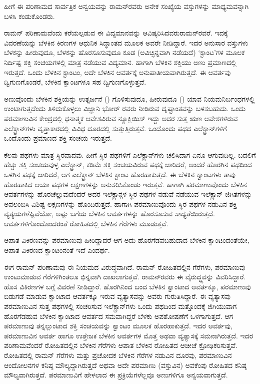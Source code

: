 ಹೀಗೆ ಈ ಪರಿಣಾಮದ ಸಾರ್ವತ್ರಿಕ ಅನ್ವಯವನ್ನು ರಾಮನ್‍ರವರು ಅನೇಕ ಸಂಖ್ಯೆಯ ವಸ್ತುಗಳನ್ನು ಮಾಧ್ಯಮವನ್ನಾಗಿ ಬಳಸಿ ಕಂಡುಕೊಂಡರು.

ರಾಮನ್ ಪರಿಣಾಮವೆಂದು ಕರೆಯಲ್ಪಡುವ ಈ ವಿದ್ಯಮಾನವನ್ನು ಆವಿಷ್ಕರಿಸಿದವರು\break ರಾಮನ್‍ರವರೆ. ಇದಕ್ಕೆ ವಿವರಣೆಯನ್ನು ಬೆಳಕಿನ ಕಿರಣಗಳ ಆಧುನಿಕ ಸಿದ್ಧಾಂತದ ಮೂಲಕ ಅವರೇ ನೀಡಿದ್ದಾರೆ. ಇದರ ಅನುಸಾರ ವಸ್ತುಗಳು ಬೆಳಕನ್ನು ಹೀರುವುದೂ, ಬೆಳಕನ್ನು ಹೊರಸೂಸುವುದೂ ಕೂಡ (ಅವಿಚ್ಛಿನ್ನವಾಗಿ ನಡೆಯದೆ) ‘ಕ್ಟಾಂಟ’ಗಳ ಮೂಲಕ ನಿರ್ದಿಷ್ಟ ಶಕ್ತಿ ಸಂಚಯಗಳಲ್ಲಿ ಮಾತ್ರ ನಡೆಯುವ ವಿದ್ಯಮಾನ. ಹಾಗಾಗಿ ಬೆಳಕಿನ ಶಕ್ತಿಯು ಅಣು ಪ್ರಮಾಣದಲ್ಲಿ ಇರುತ್ತದೆ. ಒಂದು ಬೆಳಕಿನ ಕ್ಟಾಂಟಂ, ಅದೇ ಬೆಳಕಿನ ಆವರ್ತಕ್ಕೆ ಅನುಪಾತೀಯವಾಗಿರುತ್ತದೆ. ಈ ಆವರ್ತವು ದ್ವಿಗುಣಗೊಂಡರೆ, ಬೆಳಕಿನ ಕ್ವಾಂಟಗಳೂ ಸಹ ದ್ವಿಗುಣಗೊಳ್ಳುತ್ತವೆ.

ಅಣುವೊಂದು ಬೆಳಕಿನ ಶಕ್ತಿಯನ್ನು ಉತ್ಸರ್ಜನೆ () ಗೊಳಿಸುವುದೂ, ಹೀರುವುದೂ () ಯಾವ ನಿಯಮ\enginline{-}ನಿರ್ಬಂಧಗಳಲ್ಲಿ ಉಂಟಾಗುತ್ತದೆಂದು ತಿಳಿದುಕೊಳ್ಳಲು ವಿಜ್ಞಾನಿ ಭೋರ್ ರವರು ನೀಡಿರುವ ದೃಷ್ಟಾಂತವನ್ನು ಬಳಸಬಹುದು. ಒಂದು ಪರಮಾಣುವಿನ ಕೇಂದ್ರದಲ್ಲಿ ಧನಾತ್ಮಕ ಆವೇಶವಿರುವ ನ್ಯೂಕ್ಲಿಯಿಸ್ ಇದ್ದು ಅದರ ಸುತ್ತ ಋಣ ಆವೇಶಗಳಿರುವ ಎಲೆಕ್ಟ್ರಾನ್‍ಗಳು ವೃತ್ತಾಕಾರದಲ್ಲಿ ವಿವಿಧ ದೂರದಲ್ಲಿ ಸುತ್ತುತ್ತಿರುತ್ತವೆ. ಒಂದೊಂದು ಪಥದ ಎಲೆಕ್ಟ್ರಾನ್‌ಗಳಿಗೆ ಒಂದೊಂದು ಪ್ರಮಾಣದ ಶಕ್ತಿ ಸಂಚಯ ಇರುತ್ತದೆ.

ಕೆಲವು ಪಥಗಳು ಮಾತ್ರ ಸ್ಥಿರವಾದವು. ಹೀಗೆ ಸ್ಥಿರ ಪಥಗಳಿಗೆ ಎಲೆಕ್ಟ್ರಾನ್‍ಗಳು ಚಲಿಸಿದಾಗ ಏನೂ ಆಗುವುದಿಲ್ಲ. ಬದಲಿಗೆ ಹೆಚ್ಚು ಶಕ್ತಿ ಸಂಚಯವುಳ್ಳ ಎಲೆಕ್ಟ್ರಾನ್, ಕಡಿಮೆ ಶಕ್ತಿ ಸಂಚಯವಿರುವ ಪಥಕ್ಕೆ ಜಾರಿದರೆ, ಅಂದರೆ ಹೊರಗಿನ ಪಥದಿಂದ ಒಳಗಿನ ಪಥಕ್ಕೆ ಜಾರಿದರೆ, ಆಗ ಎಲೆಕ್ಟ್ರಾನ್ ಬೆಳಕಿನ ಕ್ಟಾಂಟ ಹೊರಹಾಕುತ್ತದೆ. ಈ ಬೆಳಕಿನ ಕ್ವಾಂಟಗಳು ತಾವು ಹೊರಹಾಕಿದ ಆಯಾ ಪಥಗಳ ಲಕ್ಷಣಗಳನ್ನು ಅನುಸರಿಸಿಕೊಂಡು ಇರುತ್ತವೆ. ಹಾಗಾಗಿ ಪರಮಾಣುವೊಂದು ಬೆಳಕಿನ ಆವರ್ತಗಳನ್ನು ಹೊರಚೆಲ್ಲುವುದೆಂದರೆ ಅದರ ಇಲೆಕ್ಟ್ರಾನ್ಗಳ ಸ್ಥಿರ ಪಥಗಳ ನಡುವೆ ನಡೆಯುವ ಇಲೆಕ್ಟ್ರಾನ್ ಜಿಗಿತಗಳನ್ನು ಅವಲಂಬಿಸಿ ವಿಶಿಷ್ಟ ಲಕ್ಷಣಗಳನ್ನು ಹೊಂದಿರುತ್ತದೆ. ಹಾಗಾಗಿ ಪರಮಾಣುವೊಂದು ಸ್ಥಿರ ಪಥಗಳ ನಡುವಿನ ಶಕ್ತಿ ವ್ಯತ್ಯಯಗಳೆಷ್ಟಿವೆಯೋ, ಅಷ್ಟು ಬಗೆಯ ಬೆಳಕಿನ ಆವರ್ತಗಳನ್ನು ಹೊರಸೂಸುವ ಸಾಧ್ಯತೆಯಿರುತ್ತದೆ. ಆವರ್ತಗಳಿಗೊಂದೊಂದರಂತೆ ರೋಹಿತದಲ್ಲಿ ಬೆಳಕಿನ ಗೆರೆಗಳು ಮೂಡುತ್ತವೆ.

ಆಪಾತ ವಿಕಿರಣವನ್ನು ಪರಮಾಣುವು ಹೀರಿದ್ದಾದರೆ ಆಗ ಅದು ಹೊರಗೆಡವಬಹುದಾದ ಬೆಳಕಿನ ಕ್ವಾಂಟಂದಂತೆಯೇ, ಆಪಾತ ವಿಕಿರಣದ ಕ್ವಾಂಟಂನಂತೆ ಇದೆ ಎಂದರ್ಥ.

ಈಗ ರಾಮನ್ ಪರಿಣಾಮವು ಈ ನಿಯಮದ ವಿರುದ್ಧವಾಗಿದೆ. ರಾಮನ್ ರೋಹಿತದಲ್ಲಿನ ಗೆರೆಗಳು, ಪರಮಾಣುವು ಉಂಟುಮಾಡುವ ಗೆರೆಗಳಿಗಿಂತಲೂ ಭಿನ್ನವಾಗಿ ದಾಖಲಾಗುತ್ತವೆ. ರಾಮನ್‍ರವರು ಈ ವೈರುದ್ಧ್ಯವನ್ನು ವಿವರಿಸಿದ್ದಾರೆ. ಹೊಸ ವಿಕಿರಣಗಳ ಬಗ್ಗೆ ವಿವರಣೆ ನೀಡಿದ್ದಾರೆ. ಹೊರಗಿನಿಂದ ಬಂದ ಬೆಳಕಿನ ಕ್ವಾಂಟಾದ ಆವರ್ತಕ್ಕೂ, ಪರಮಾಣುವು ಬಿಡುಗಡೆ ಮಾಡುವ ಕ್ವಾಂಟಾದ ಆವರ್ತಕ್ಕೂ ಇರುವ ವ್ಯತ್ಯಾಸವನ್ನು ಅವರು ಗುರುತಿಸಿದ್ದಾರೆ. ಈ ವ್ಯತ್ಯಾಸವು ಪರಮಾಣುವಿನ ಸುತ್ತ ಪಥಗಳಲ್ಲಿ ಸಂಚರಿಸುವ ಇಲೆಕ್ಟ್ರಾನ್‍ಗಳು ಒಂದು ಪಥದಿಂದ ಮತ್ತೊಂದಕ್ಕೆ ಜಿಗಿಯುವಾಗ ಹೊರಗೆಡಹುವ ಬೆಳಕಿನ ಕ್ವಾಂಟಾದ ಆವರ್ತದ ಸಮವಾಗಿದ್ದರೆ ಬೆಳಕು ಅಪಶೋಷಣೆಗೆ ಒಳಗಾಗುತ್ತದೆ. ಆಗ ಪರಮಾಣುವು ತನ್ನಲ್ಲುಂಟಾದ ಶಕ್ತಿ ಸಂಚಯವನ್ನು ಕ್ವಾಂಟಂ ಮೂಲಕ ಹೊರಹಾಕುತ್ತದೆ. ಇದರ ಆವರ್ತವು, ಪರಮಾಣುವಿನ ಆವರ್ತ ಹಾಗೂ ಉತ್ತೇಜಕ ಬೆಳಕಿನ ಆವರ್ತಗಳ ಮೊತ್ತ ಅಥವಾ ವ್ಯತ್ಯಾಸಕ್ಕೆ ಸಮನಾಗಿರುತ್ತದೆ. ಇದರ ಪರಿಣಾಮವೆಂದರೆ ರೋಹಿತದಲ್ಲಿನ ಬೆಳಕಿನ ಗೆರೆಗಳು ಆಪಾತ ಬೆಳಕಿನ ರೋಹಿತದ ಆಚೀಚೆ ಕ್ರೋಢಿಕರಿಸುತ್ತವೆ. ರೋಹಿತದಲ್ಲಿ ರಾಮನ್ ಗೆರೆಗಳು ಮತ್ತು ಪ್ರಚೋದಕ ಬೆಳಕಿನ ಗೆರೆಗಳ ನಡುವಿನ ದೂರವು, ಪರಮಾಣುವಿನ ಆಂದೋಲನಗಳ ಕನಿಷ್ಠ ಮೌಲ್ಯದ್ದಾಗಿರುತ್ತದೆ ಅಥವಾ ಅದೇ ಪರಮಾಣು (ವಸ್ತುವಿನ) ಅವಕೆಂಪು ರೋಹಿತದ ಕನಿಷ್ಠ ಮೌಲ್ಯವಾಗಿರುತ್ತದೆ. ಪರಮಾಣುವಿಗೆ ಹೇಳಲಾದ ಈ ಪ್ರಕ್ರಿಯೆಗಳೆಲ್ಲವೂ ಅಣುಗಳಿಗೂ ಅನ್ವಯವಾಗುತ್ತದೆ.

